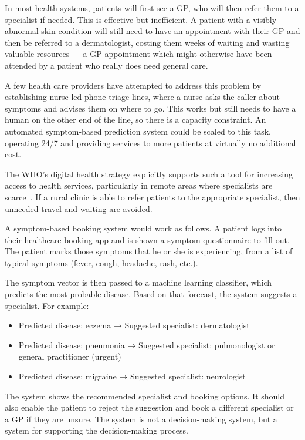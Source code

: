 In most health systems, patients will first see a GP, who will then refer them to a specialist if needed. This is effective but inefficient. A patient with a visibly abnormal skin condition will still need to have an appointment with their GP and then be referred to a dermatologist, costing them weeks of waiting and wasting valuable resources --- a GP appointment which might otherwise have been attended by a patient who really does need general care.

A few health care providers have attempted to address this problem by establishing nurse-led phone triage lines, where a nurse asks the caller about symptoms and advises them on where to go. This works but still needs to have a human on the other end of the line, so there is a capacity constraint. An automated symptom-based prediction system could be scaled to this task, operating 24/7 and providing services to more patients at virtually no additional cost.

The WHO's digital health strategy explicitly supports such a tool for increasing access to health services, particularly in remote areas where specialists are scarce~\citep{WHO2021}. If a rural clinic is able to refer patients to the appropriate specialist, then unneeded travel and waiting are avoided.

A symptom-based booking system would work as follows. A patient logs into their healthcare booking app and is shown a symptom questionnaire to fill out. The patient marks those symptoms that he or she is experiencing, from a list of typical symptoms (fever, cough, headache, rash, etc.).

The symptom vector is then passed to a machine learning classifier, which predicts the most probable disease. Based on that forecast, the system suggests a specialist. For example:

\begin{itemize}
    \item Predicted disease: eczema → Suggested specialist: dermatologist
    \item Predicted disease: pneumonia → Suggested specialist: pulmonologist or general practitioner (urgent)
    \item Predicted disease: migraine → Suggested specialist: neurologist
\end{itemize}

The system shows the recommended specialist and booking options. It should also enable the patient to reject the suggestion and book a different specialist or a GP if they are unsure. The system is not a decision-making system, but a system for supporting the decision-making process.

